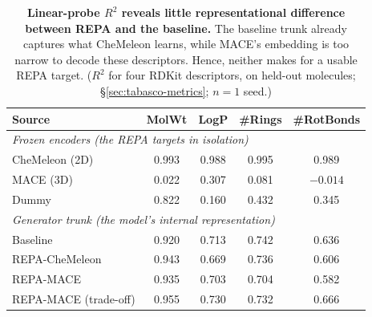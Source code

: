 \begin{table}[tbp]
\centering
\small
\begin{tabular}{l c c c c}
\toprule
\textbf{Source} & \textbf{MolWt} & \textbf{LogP} & \textbf{\#Rings} & \textbf{\#RotBonds} \\
\midrule
\multicolumn{5}{l}{\textit{Frozen encoders (the REPA targets in isolation)}} \\
CheMeleon (2D) & 0.993 & 0.988 & 0.995 & 0.989 \\
MACE (3D)      & 0.022 & 0.307 & 0.081 & $-0.014$ \\
Dummy          & 0.822 & 0.160 & 0.432 & 0.345 \\
\midrule
\multicolumn{5}{l}{\textit{Generator trunk (the model's internal representation)}} \\
Baseline             & 0.920 & 0.713 & 0.742 & 0.636 \\
REPA-CheMeleon       & 0.943 & 0.669 & 0.736 & 0.606 \\
REPA-MACE            & 0.935 & 0.703 & 0.704 & 0.582 \\
REPA-MACE (trade-off) & 0.955 & 0.730 & 0.732 & 0.666 \\
\bottomrule
\end{tabular}
\caption{\textbf{Linear-probe $R^2$ reveals little representational difference between REPA and the baseline.} The baseline trunk already captures what CheMeleon learns, while MACE's embedding is too narrow to decode these descriptors. Hence, neither makes for a usable REPA target. ($R^2$ for four RDKit descriptors, on held-out molecules; \S\ref{sec:tabasco-metrics}; $n{=}1$ seed.)}
\label{tab:tabasco-probe}
\end{table}
